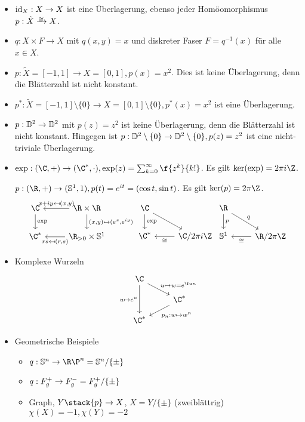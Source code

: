 \begin{ex}
	\begin{itemize}
		\item
			$\operatorname{id}_X: X \to X$ ist eine Überlagerung, ebenso jeder Homöomorphismus $p: \tilde X \homeomorphicto X$.
		\item
			$q: X \times F \to X$ mit $q(x, y) = x$ und diskreter Faser $F = q^{-1}(x)$ für alle $x \in X$.
		\item
			$p: \tilde X = [-1, 1] \to X = [0, 1], p(x) = x^2$.
			Dies ist keine Überlagerung, denn die Blätterzahl ist nicht konstant.
		\item
			$p^*: \tilde X = [-1, 1] \setminus \{0\} \to X = [0, 1] \setminus \{0\}, p^*(x) = x^2$ ist eine Überlagerung.
		\item
			$p: \mathbb{D}^2 \to \mathbb{D}^2$ mit $p(z) = z^2$ ist keine Überlagerung, denn die Blätterzahl ist nicht konstant.
			Hingegen ist $p: \mathbb{D}^2 \setminus \{0\} \to \mathbb{D}^2 \setminus \{0\}, p(z) = z^2$ ist eine nicht-triviale Überlagerung.
		\item
			$\exp: (\C, +) \to (\C^*, \cdot), \exp(z) = \sum_{k=0}^\infty \f {z^k}{k!}$.
			Es gilt $\ker(\exp) = 2\pi i \Z$.

			$p: (\R, +) \to (\S^1, 1), p(t) = e^{it} = (\cos t, \sin t)$.
			Es gilt $\ker(p) = 2\pi \Z$.
			\[
				\begin{tikzcd}
					\C \arrow{d}{\exp} & \R \times \R \arrow{l}[swap]{x+iy \mapsfrom (x,y)} \arrow{d}{(x,y)\mapsto(e^x, e^{iy})}\\
					\C^* & \R_{>0} \times \S^1 \arrow{l}{rs \mapsfrom (r,s)}
				\end{tikzcd}
				\begin{tikzcd}
					\C \arrow{d}{\exp} \arrow{dr} & \\
					\C^* & \C / 2\pi i \Z \arrow{l}{\homeomorphic}
				\end{tikzcd}
				\begin{tikzcd}
					\R \arrow{d}{p} \arrow{dr}{q} & \\
					\S^1 & \R / 2\pi \Z \arrow{l}{\homeomorphic}
				\end{tikzcd}
			\]
		\item
			Komplexe Wurzeln
			\[
				\begin{tikzcd}[row sep=small]
					\C \arrow{dd}[swap]{u \mapsto e^u} \arrow{dr}{u \mapsto w = e^{\f un}} & \\
					& \C^* \arrow{dl}{p_n: w \mapsto w^n} \\
					\C^* &
				\end{tikzcd}
			\]
		\item
			Geometrische Beispiele
			\begin{itemize}
				\item
					$q: \S^n \surto \R\P^n = \S^n / \{\pm\}$
				\item
					$q: F_g^+ \to F_g^- = F_g^+ / \{\pm\}$
				\item
					Graph, $Y \stack{p}\to X$, $X = Y / \{\pm\}$ (zweiblättrig)
					$\chi(X) = -1, \chi(Y) = -2$


\end{itemize}
\end{itemize}
\end{ex}
